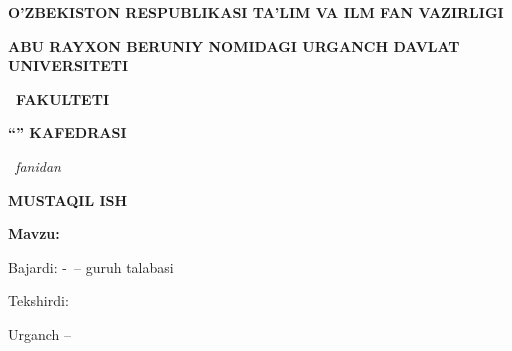 \documentclass[a4paper,12pt]{article}
\begin{document}
\thispagestyle{empty}
\begin{center}
  {\bfseries O’ZBEKISTON RESPUBLIKASI TA’LIM VA ILM FAN VAZIRLIGI\par}
  \vspace{0.4cm}
  {\bfseries ABU RAYXON BERUNIY NOMIDAGI URGANCH DAVLAT UNIVERSITETI\par}
  \vspace{0.4cm}
  {\bfseries \MakeUppercase{\Fakultet}\ FAKULTETI\par}
  \vspace{0.4cm}
  {\bfseries “\MakeUppercase{\Kafedra}” KAFEDRASI\par}
  \vspace{1.8cm}
  {\itshape \Fan\ fanidan\par}
  \vspace{0.8cm}
  {\LARGE\bfseries MUSTAQIL ISH\par}
\end{center}
\vspace{0.8cm}
\noindent\textbf{Mavzu:} \expandafter\uline\expandafter{\Mavzu}\par
\vspace{1.4cm}
\noindent\hfill
\begin{minipage}{0.52\textwidth}
  \raggedright
  Bajardi: \Guruh-\Yonalish\ -- guruh talabasi\par
  \Talaba\par
  \vspace{0.8cm}
  Tekshirdi: \Rahbar\par
\end{minipage}
\par\vfill
\begin{center}
  Urganch -- \Yil
\end{center}
\clearpage

\tableofcontents





\end{document}
